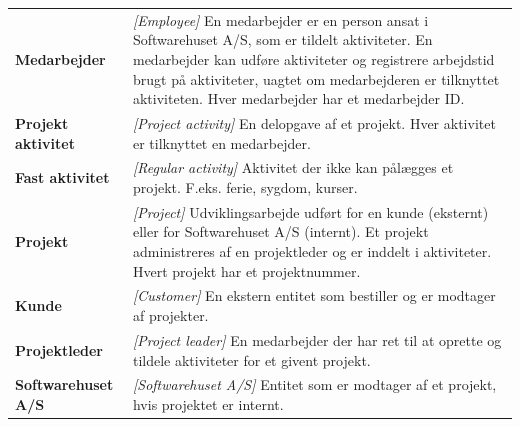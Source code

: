 \begin{table}[H]
    \centering
    \setlength{\extrarowheight}{8pt}
    \begin{tabular}{>{\bfseries}l p{}}
        Medarbejder           & \textit{[Employee]} En medarbejder er en person ansat i Softwarehuset A/S, som er tildelt aktiviteter. En medarbejder kan udføre aktiviteter og registrere arbejdstid brugt på aktiviteter, uagtet om medarbejderen er tilknyttet aktiviteten. Hver medarbejder har et medarbejder ID.                                     \\
        Projekt aktivitet     & \textit{[Project activity]} En delopgave af et projekt. Hver aktivitet er tilknyttet en medarbejder.                                                                                                                                                                                                                       \\
        Fast aktivitet        & \textit{[Regular activity]} Aktivitet der ikke kan pålægges et projekt. F.eks. ferie, sygdom, kurser.                                                                                                                                                                                                                      \\
        Projekt               & \textit{[Project]} Udviklingsarbejde udført for en kunde (eksternt) eller for Softwarehuset A/S (internt). Et projekt administreres af en projektleder og er inddelt i aktiviteter. Hvert projekt har et projektnummer.                                                                                                    \\
        Kunde                 & \textit{[Customer]} En ekstern entitet som bestiller og er modtager af projekter.                                                                                                                                                                                                                                          \\
        Projektleder          & \textit{[Project leader]} En medarbejder der har ret til at oprette og tildele aktiviteter for et givent projekt.                                                                                                                                                                                                          \\
        Softwarehuset A/S     & \textit{[Softwarehuset A/S]} Entitet som er modtager af et projekt, hvis projektet er internt.                                                                                                                                                                                                                             \\

\end{tabular}
\end{table}
